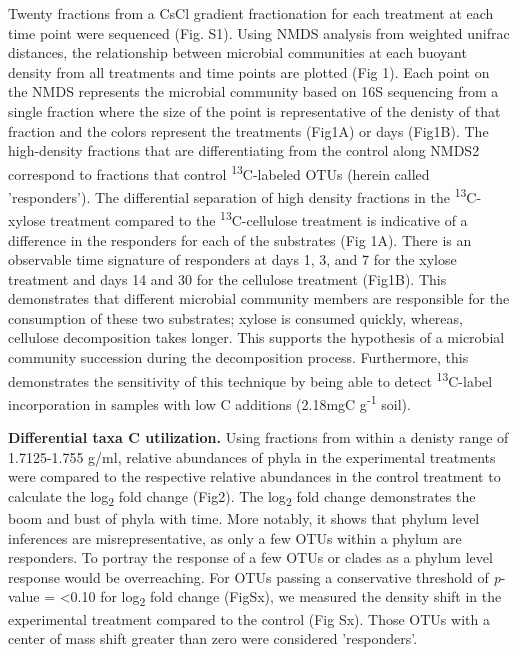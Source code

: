 Twenty fractions from a CsCl gradient fractionation for each treatment at each time point were sequenced (Fig. S1). Using NMDS analysis from weighted unifrac distances, the relationship between microbial communities at each buoyant density from all treatments and time points are plotted (Fig 1). Each point on the NMDS represents the microbial community based on 16S sequencing from a single fraction where the size of the point is representative of the denisty of that fraction and the colors represent the treatments (Fig1A) or days (Fig1B). The high-density fractions that are differentiating from the control along NMDS2 correspond to fractions that control \textsuperscript{13}C-labeled OTUs (herein called 'responders'). The differential separation of high density fractions in the \textsuperscript{13}C-xylose treatment compared to the \textsuperscript{13}C-cellulose treatment is indicative of a difference in the responders for each of the substrates (Fig 1A). There is an observable time signature of responders at days 1, 3, and 7 for the xylose treatment and days 14 and 30 for the cellulose treatment (Fig1B). This demonstrates that different microbial community members are responsible for the consumption of these two substrates; xylose is consumed quickly, whereas, cellulose decomposition takes longer. This supports the hypothesis of a microbial community succession during the decomposition process. Furthermore, this demonstrates the sensitivity of this technique by being able to detect \textsuperscript{13}C-label incorporation in samples with low C additions (2.18mgC g\textsuperscript{-1} soil).    


\textbf{Differential taxa C utilization.} Using fractions from within a denisty range of 1.7125-1.755 g/ml, relative abundances of phyla in the experimental treatments were compared to the respective relative abundances in the control treatment to calculate the log\textsubscript{2} fold change (Fig2). The log\textsubscript{2} fold change demonstrates the boom and bust of phyla with time.  More notably, it shows that phylum level inferences are misrepresentative, as only a few OTUs within a phylum are responders. To portray the response of a few OTUs or clades as a phylum level response would be overreaching. For OTUs passing a conservative threshold of \textit{p}-value = <0.10 for log\textsubscript{2} fold change (FigSx), we measured the density shift in the experimental treatment compared to the control (Fig Sx).  Those OTUs with a center of mass shift greater than zero were considered 'responders'.   

